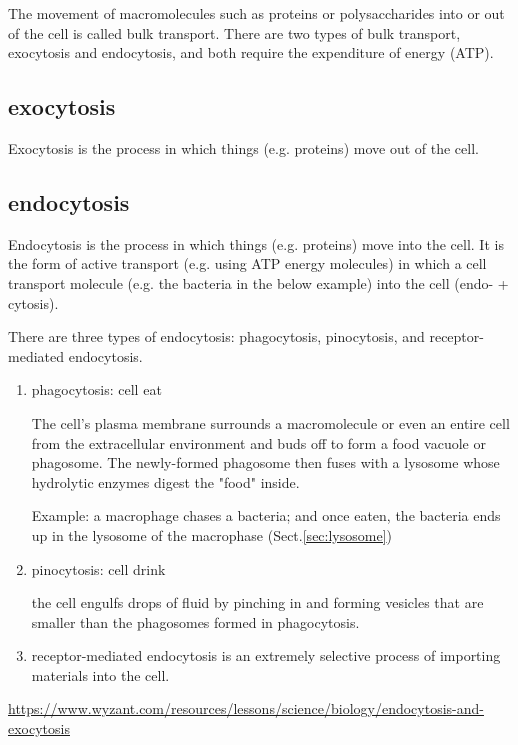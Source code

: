 The movement of macromolecules such as proteins or polysaccharides into or out
of the cell is called bulk transport. There are two types of bulk transport,
exocytosis and endocytosis, and both require the expenditure of energy (ATP).

\subsection{exocytosis}
\label{sec:exocytosis}

Exocytosis is the process in which things (e.g. proteins) move out of the cell.

\subsection{endocytosis}
\label{sec:endocytosis}


Endocytosis is the process in which things (e.g. proteins) move into the cell.
It is the form of active transport (e.g.
using ATP energy molecules) in which a cell transport molecule (e.g. the
bacteria in the below example) into the cell (endo- + cytosis).


There are three types of endocytosis: phagocytosis, pinocytosis, and
receptor-mediated endocytosis.
\begin{enumerate}
  \item phagocytosis: cell eat
  
The cell's plasma membrane surrounds a macromolecule or even an entire cell
from the extracellular environment and buds off to form a food vacuole or phagosome. 
The newly-formed phagosome then fuses with a lysosome whose hydrolytic enzymes
digest the "food" inside. 


Example: a macrophage chases a bacteria; and once eaten, the bacteria ends up in
the lysosome of the macrophase (Sect.\ref{sec:lysosome})

  \item pinocytosis: cell drink
  
the cell engulfs drops of fluid by pinching in and forming vesicles that are
smaller than the phagosomes formed in phagocytosis. 

  \item receptor-mediated endocytosis is an extremely selective process of
  importing materials into the cell.
\end{enumerate}
\url{https://www.wyzant.com/resources/lessons/science/biology/endocytosis-and-exocytosis}




